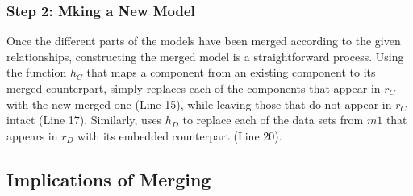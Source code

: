 
\subsubsection{Step 2: Mking a New Model}

Once the different parts of the models have been merged according to
the given relationships, constructing the merged model is a
straightforward process. Using the function $h_{C}$ that maps a component
from an existing component to its merged counterpart, 
simply replaces each of the components that appear in $r_{C}$ with the
new merged one (Line 15), while leaving those that do not appear in
$r_{C}$ intact (Line 17). Similarly,  uses $h_{D}$
to replace each of the data sets from $m1$ that appears in $r_{D}$
with its embedded counterpart (Line 20).  

\subsection{Implications of Merging}

